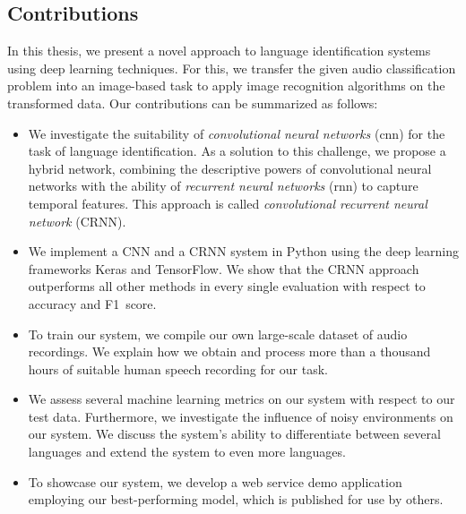 \subsection{Contributions}
In this thesis, we present a novel approach to language identification systems using deep learning techniques. For this, we transfer the given audio classification problem into an image-based task to apply image recognition algorithms on the transformed data. Our contributions can be summarized as follows:
\begin{itemize}
	\item We investigate the suitability of \emph{convolutional neural networks} (\ac{cnn}) for the task of language identification. As a solution to this challenge, we propose a hybrid network, combining the descriptive powers of convolutional neural networks with the ability of \emph{recurrent neural networks} (\ac{rnn}) to capture temporal features. This approach is called \emph{convolutional recurrent neural network} (CRNN).
	\item We implement a CNN and a CRNN system in Python using the deep learning frameworks Keras and TensorFlow. We show that the CRNN approach outperforms all other methods in every single evaluation with respect to accuracy and F1~score.
	\item To train our system, we compile our own large-scale dataset of audio recordings. We explain how we obtain and process more than a thousand hours of suitable human speech recording for our task.
	\item We assess several machine learning metrics on our system with respect to our test data. Furthermore, we investigate the influence of noisy environments on our system. We discuss the system's ability to differentiate between several languages and extend the system to even more languages.
	\item To showcase our system, we develop a web service demo application employing our best-performing model, which is published for use by others.
\end{itemize}


